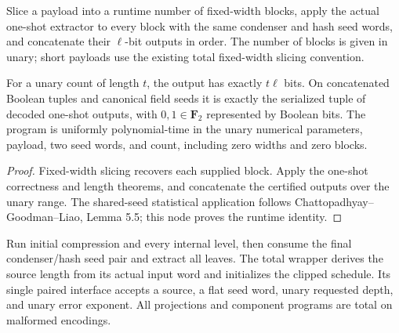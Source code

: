 \begin{definition}
  \label{def:lowerbounds-algebraic-one-shot-block-program}
  \leanok
  Slice a payload into a runtime number of fixed-width blocks, apply
  the actual one-shot extractor to every block with the same condenser
  and hash seed words, and concatenate their $\ell$-bit outputs in order.
  The number of blocks is given in unary; short payloads use the existing
  total fixed-width slicing convention.
\end{definition}

\begin{theorem}
  \label{thm:lowerbounds-algebraic-one-shot-block-program}
  \leanok
  For a unary count of length $t$, the output has exactly $t\ell$ bits.
  On concatenated Boolean tuples and canonical field seeds it is exactly
  the serialized tuple of decoded one-shot outputs, with $0,1\in\mathbf F_2$
  represented by Boolean bits. The program is uniformly polynomial-time
  in the unary numerical parameters, payload, two seed words, and count,
  including zero widths and zero blocks.
\end{theorem}
\begin{proof}
  \leanok
  Fixed-width slicing recovers each supplied block. Apply the one-shot
  correctness and length theorems, and concatenate the certified outputs
  over the unary range. The shared-seed statistical application follows
  Chattopadhyay--Goodman--Liao, Lemma 5.5; this node proves the runtime identity.
\end{proof}

\begin{definition}
  \label{def:lowerbounds-algebraic-scheduled-program}
  \leanok
  Run initial compression and every internal level, then consume the
  final condenser/hash seed pair and extract all leaves. The total wrapper
  derives the source length from its actual input word and initializes
  the clipped schedule. Its single paired interface accepts a source,
  a flat seed word, unary requested depth, and unary error exponent.
  All projections and component programs are total on malformed encodings.
\end{definition}

